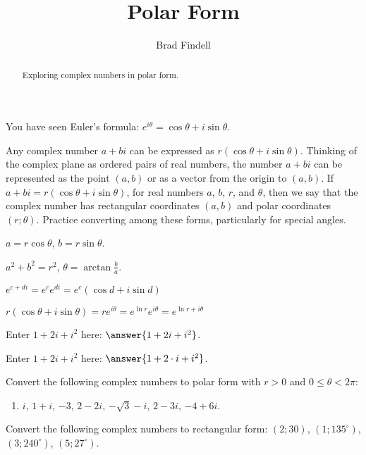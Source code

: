 \documentclass[space,nooutcomes]{ximera}
\title{Polar Form}
\author{Brad Findell}
\begin{document}
\begin{abstract}
Exploring complex numbers in polar form.   
\end{abstract}
\maketitle




You have seen Euler's formula: $e^{i\theta}=\cos\theta +i\sin\theta$.  

Any complex number $a+bi$ can be expressed as $r(\cos\theta +i\sin\theta)$.  Thinking of the complex plane as ordered pairs of real numbers, the number $a+bi$ can be represented as the point $(a,b)$ or as a vector from the origin to $(a,b)$.  If $a+bi = r(\cos\theta +i\sin\theta)$, for real numbers $a$, $b$, $r$, and $\theta$, then we say that the complex number has rectangular coordinates $(a,b)$ and polar coordinates $(r;\theta)$.  Practice converting among these forms, particularly for special angles.


\begin{problem}

$a=r\cos\theta$, $b=r\sin\theta$. 

$a^2+b^2=r^2$, $\theta = \arctan\frac{b}{a}$. 

$e^{c+di}=e^ce^{di}=e^c(\cos d +i\sin d)$

$r(\cos \theta +i\sin \theta)= re^{i\theta}=e^{\ln r}e^{i\theta}=e^{\ln r+i\theta}$

\end{problem}

\begin{problem}
Enter $1+2i+i^2$ here: $\answer{1+2i+i^2}$.

Enter $1+2i+i^2$ here: $\answer{1+2\cdot i+i^2}$.
\end{problem}


\begin{problem}
Convert the following complex numbers to polar form with $r>0$ and $0\le\theta < 2\pi$:
\begin{enumerate}
\item  $i$, $1 + i$,  $-3$, $2 - 2i$, $-\sqrt{3}-i$, $2 - 3i$, $-4 + 6i$.  
\end{enumerate}
\vfill 
\end{problem}

\begin{problem}
Convert the following complex numbers to rectangular form: $(2; 30)$, $(1; 135^\circ)$, 
$(3; 240^\circ)$, $(5; 27^\circ)$.  
\vfill 
\end{problem}
\end{document}
